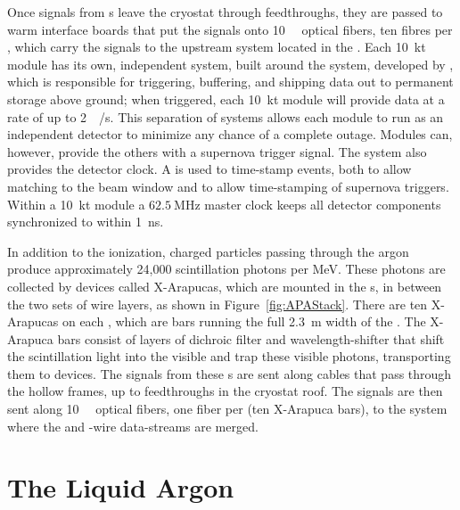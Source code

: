 Once signals from s leave the cryostat through feedthroughs, they are passed to warm interface boards that put the signals onto \SI{10}{\giga\byte} optical fibers, ten fibres per , which carry the signals to the upstream  system located in the . Each \SI{10}{\kilo\tonne} module has its own, independent  system, built around the  system, developed by , which is responsible for triggering, buffering, and shipping data out to permanent storage above ground; when triggered, each \SI{10}{\kilo\tonne} module will provide data at a rate of up to \SI{2}{\tera\byte/\second}. This separation of  systems allows each module to run as an independent detector to minimize any chance of a complete  outage. Modules can, however, provide the others with a supernova trigger signal. The  system also provides the detector clock. A   is used to time-stamp events, both to allow matching to the beam window and to allow time-stamping of supernova triggers. Within a \SI{10}{\kilo\tonne} module a $\SI{62.5}{\mega\hertz}$ master clock keeps all detector components synchronized to within \SI{1}{\nano\second}.

In addition to the ionization, charged particles passing through the argon produce approximately 24,000 scintillation photons per \si{\mega\electronvolt}. These photons are collected by devices called X-Arapucas, which are mounted in the s, in between the two sets of wire layers, as shown in Figure~\ref{fig:APAStack}. There are ten X-Arapucas on each , which are bars running the full \SI{2.3}{\meter} width of the . The X-Arapuca bars consist of layers of dichroic filter and wavelength-shifter that shift the  scintillation light into the visible and trap these visible photons, transporting them to  devices. The signals from these s are sent along cables that pass through the hollow  frames, up to feedthroughs in the cryostat roof. The signals are then sent along \SI{10}{\giga\byte} optical fibers, one fiber per  (ten X-Arapuca bars), to the  system where the  and -wire data-streams are merged.

\section{The Liquid Argon}
\label{sec:fdsp-exec-liquidargon}

